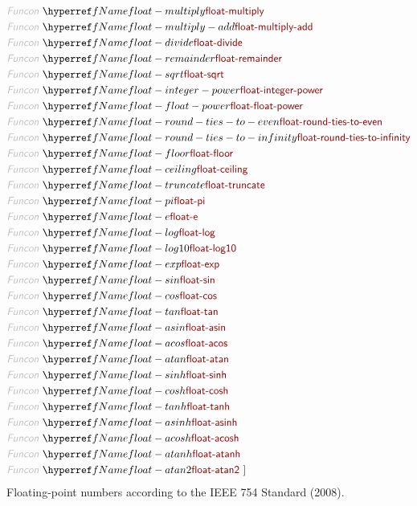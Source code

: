 \begin{align*}
  \KEY{Funcon} ~ & \NAMEREF{float-multiply} \\
  \KEY{Funcon} ~ & \NAMEREF{float-multiply-add} \\
  \KEY{Funcon} ~ & \NAMEREF{float-divide} \\
  \KEY{Funcon} ~ & \NAMEREF{float-remainder} \\
  \KEY{Funcon} ~ & \NAMEREF{float-sqrt} \\
  \KEY{Funcon} ~ & \NAMEREF{float-integer-power} \\
  \KEY{Funcon} ~ & \NAMEREF{float-float-power} \\
  \KEY{Funcon} ~ & \NAMEREF{float-round-ties-to-even} \\
  \KEY{Funcon} ~ & \NAMEREF{float-round-ties-to-infinity} \\
  \KEY{Funcon} ~ & \NAMEREF{float-floor} \\
  \KEY{Funcon} ~ & \NAMEREF{float-ceiling} \\
  \KEY{Funcon} ~ & \NAMEREF{float-truncate} \\
  \KEY{Funcon} ~ & \NAMEREF{float-pi} \\
  \KEY{Funcon} ~ & \NAMEREF{float-e} \\
  \KEY{Funcon} ~ & \NAMEREF{float-log} \\
  \KEY{Funcon} ~ & \NAMEREF{float-log10} \\
  \KEY{Funcon} ~ & \NAMEREF{float-exp} \\
  \KEY{Funcon} ~ & \NAMEREF{float-sin} \\
  \KEY{Funcon} ~ & \NAMEREF{float-cos} \\
  \KEY{Funcon} ~ & \NAMEREF{float-tan} \\
  \KEY{Funcon} ~ & \NAMEREF{float-asin} \\
  \KEY{Funcon} ~ & \NAMEREF{float-acos} \\
  \KEY{Funcon} ~ & \NAMEREF{float-atan} \\
  \KEY{Funcon} ~ & \NAMEREF{float-sinh} \\
  \KEY{Funcon} ~ & \NAMEREF{float-cosh} \\
  \KEY{Funcon} ~ & \NAMEREF{float-tanh} \\
  \KEY{Funcon} ~ & \NAMEREF{float-asinh} \\
  \KEY{Funcon} ~ & \NAMEREF{float-acosh} \\
  \KEY{Funcon} ~ & \NAMEREF{float-atanh} \\
  \KEY{Funcon} ~ & \NAMEREF{float-atan2}
  ~ ]
\end{align*}
Floating-point numbers according to the IEEE 754 Standard (2008).

